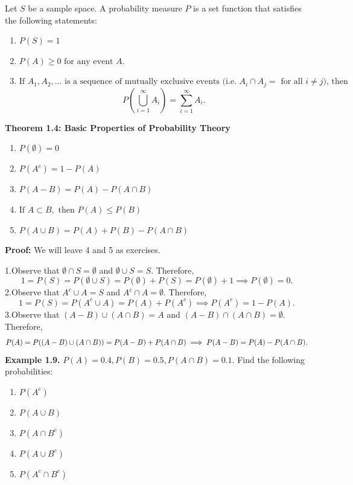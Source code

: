 \documentclass[
  12pt,
]{krantzNoCorner}
\providecommand{\tightlist}{%
  \setlength{\itemsep}{0pt}\setlength{\parskip}{0pt}}
\begin{document}
Let \(S\) be a sample space. A probability measure \(P\) is a set function
that satisfies the following statements:

\begin{enumerate}
\def\labelenumi{\arabic{enumi}.}
\tightlist
\item
  \(P(S)=1\)
\item
  \(P(A)\geq 0 \mbox{ for any event } A\).
\item
  \(\mbox{If } A_1,A_2,... \mbox{ is a sequence of mutually exclusive events (i.e. } A_i\cap A_j = \mbox{ for all } i\neq j\mbox{), then }\)
  \[P\left(\bigcup_{i=1}^{\infty}A_i\right)=\sum_{i=1}^{\infty}A_i.\]
\end{enumerate}

\textbf{Theorem 1.4: Basic Properties of Probability Theory}

\begin{enumerate}
\def\labelenumi{\arabic{enumi}.}
\tightlist
\item
  \(P(\emptyset)=0\)
\item
  \(P(A^c)=1-P(A)\)
\item
  \(P(A-B) = P(A)-P(A\cap B)\)
\item
  \(\mbox{If }A\subset B, \mbox{ then } P(A)\leq P(B)\)
\item
  \(P(A\cup B)=P(A)+P(B)-P(A\cap B)\)
\end{enumerate}

\textbf{Proof:} We will leave 4 and 5 as exercises.

1.Observe that \(\emptyset \cap S = \emptyset\) and
\(\emptyset \cup S = S.\) Therefore,
\[1=P(S)=P(\emptyset \cup S)=P(\emptyset)+P(S)=P(\emptyset)+1\implies P(\emptyset)=0.\]
2.Observe that \(A^c\cup A = S\) and \(A^c\cap A = \emptyset\). Therefore,
\[1=P(S)=P(A^c\cup A)=P(A)+P(A^c)\implies P(A^c)=1-P(A).\] 3.Observe
that \((A-B)\cup (A\cap B)=A\) and \((A-B)\cap (A\cap B)=\emptyset.\)
Therefore,
\[P(A)=P((A-B)\cup (A\cap B))=P(A-B)+P(A\cap B)\\ \implies P(A-B) = P(A)-P(A\cap B).\]
\textbf{Example 1.9.} \(P(A)=0.4, P(B)=0.5,P(A\cap B)=0.1.\) Find the following
probabilities:

\begin{enumerate}
\def\labelenumi{\arabic{enumi}.}
\tightlist
\item
  \(P(A^c)\)
\item
  \(P(A\cup B)\)
\item
  \(P(A\cap B^c)\)
\item
  \(P(A\cup B^c)\)
\item
  \(P(A^c\cap B^c)\)
\end{enumerate}
\end{document}
